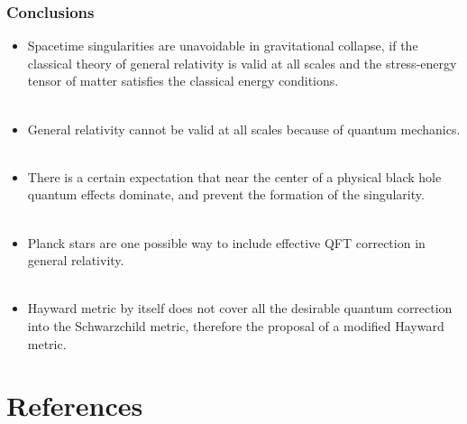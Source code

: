 \documentclass{beamer}
\begin{document}
\begin{frame}
\frametitle{Conclusions}
\small
\begin{itemize}
\item Spacetime singularities are unavoidable in gravitational collapse, if the classical theory of general relativity is valid at all scales and the stress-energy tensor of matter satisfies the classical energy conditions.\\\

\item General relativity cannot be valid at all scales because of quantum mechanics.\\\

\item There is a certain expectation that near the center of a physical black hole quantum effects dominate, and prevent the formation of the singularity.\\\

\item Planck stars are one possible way to include effective QFT correction in general relativity.\\\

\item Hayward metric by itself does not cover all the desirable quantum correction into the Schwarzchild metric, therefore the proposal of a modified Hayward metric.

\end{itemize}
\end{frame}

\section{References}
\end{document}
